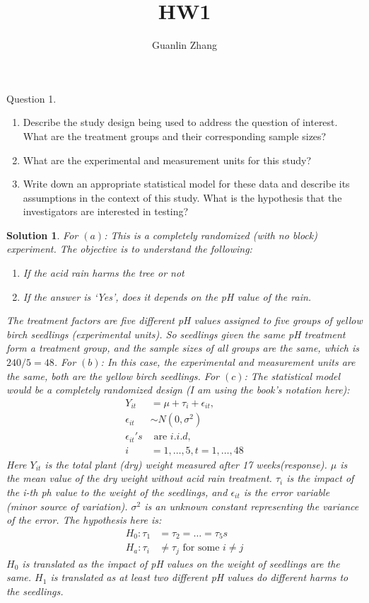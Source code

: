 \documentclass[11pt]{article}
\title{HW1}
\author{Guanlin Zhang}
\newtheorem{sol}{Solution}
\begin{document}
Question 1.
	\begin{enumerate}
		\item [(a)] Describe the study design being used to address the question of interest. What are the treatment groups and their corresponding sample sizes?
		\item [(b)] What are the experimental and measurement units for this study?
		\item [(c)] Write down an appropriate statistical model for these data and describe its assumptions in the context of this study. What is the hypothesis that the investigators are interested in testing?
	\end{enumerate}
\begin{sol}
	For $(a)$:\vskip 2mm
	This is a completely randomized (with no block) experiment. The objective is to understand the following:
	\begin{enumerate}
		\item [(1)] If the acid rain harms the tree or not
		\item [(2)] If the answer is `Yes', does it depends on the pH value of the rain.
	\end{enumerate}
	The treatment factors are five different pH values assigned to five groups of yellow birch seedlings (experimental units). So seedlings given the same pH treatment form a treatment group, and the sample sizes of all groups are the same, which is $240/5 = 48$.
	\vskip 2mm
	For $(b)$:\vskip 2mm
	In this case, the experimental and measurement units are the same, both are the yellow birch seedlings. \vskip 2mm
	For $(c)$:\vskip 2mm
	The statistical model would be a completely randomized design (I am using the book's notation here):
	\begin{align*}
		Y_{it} &= \mu + \tau_i + \epsilon_{it},\\
		\epsilon_{it} &\sim N(0, \sigma^2) \\
		\epsilon_{it}'s &\text{ are } i.i.d, \\
		i &= 1, \ldots, 5, t = 1, \ldots, 48
	\end{align*}
         Here $Y_{it}$ is the total plant (dry) weight measured after 17 weeks(response). $\mu$ is the mean value of the dry weight without acid rain treatment. $\tau_i$ is the impact of the i-th ph value to the weight of the seedlings, and $\epsilon_{it}$ is the error variable (minor source of variation). $\sigma^2$ is an unknown constant representing the variance of the error.\vskip 2mm
         The hypothesis here is:
         \begin{align*}
         	H_0: \tau_1 &= \tau_2 = \ldots = \tau_5 s\\
         	H_a: \tau_i &\neq \tau_j \text{ for some }i \neq j
         \end{align*}
         $H_0$ is translated as the impact of pH values on the weight of seedlings are the same. $H_1$ is translated as at least two different pH values do different harms to the seedlings.\vskip 2mm
\end{sol}
\end{document}
